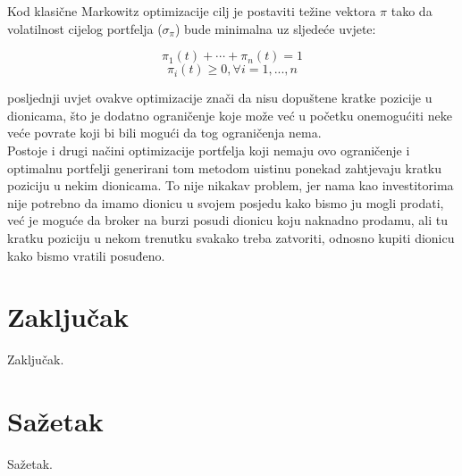 \documentclass[times, utf8, seminar]{fer}
\begin{document}
Kod klasične Markowitz optimizacije cilj je postaviti težine vektora $\pi$ tako da volatilnost cijelog portfelja ($\sigma_{\pi}$) bude minimalna uz sljedeće uvjete:

\[ \pi_1(t) + \cdots + \pi_n(t) = 1 \]
\[ \pi_i(t) \geq 0, \forall i = 1,...,n \]

posljednji uvjet ovakve optimizacije znači da nisu dopuštene kratke pozicije u dionicama, što je dodatno ograničenje koje može već u početku onemogućiti neke veće povrate koji bi bili mogući da tog ograničenja nema. \\

Postoje i drugi načini optimizacije portfelja koji nemaju ovo ograničenje i optimalnu portfelji generirani tom metodom uistinu ponekad zahtjevaju kratku poziciju u nekim dionicama. To nije nikakav problem, jer nama kao investitorima nije potrebno da imamo dionicu u svojem posjedu kako bismo ju mogli prodati, već je moguće da broker na burzi posudi dionicu koju naknadno prodamu, ali tu kratku poziciju u nekom trenutku svakako treba zatvoriti, odnosno kupiti dionicu kako bismo vratili posuđeno.

\chapter{Zaključak}
Zaključak.




\chapter{Sažetak}
Sažetak.
\end{document}
